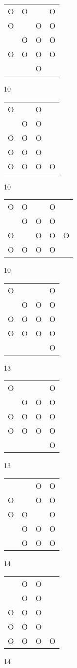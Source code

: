 \begin{tabular}{|m{0.2cm}m{0.2cm}m{0.2cm}m{0.2cm}|}\hline
O&O& &O\\
O& &O&O\\
 &O&O&O\\
O&O&O&O\\
 & &O& \\
\hline\end{tabular}10
\begin{tabular}{|m{0.2cm}m{0.2cm}m{0.2cm}m{0.2cm}|}\hline
O& &O& \\
 &O&O& \\
O&O&O& \\
O&O&O& \\
O&O&O&O\\
\hline\end{tabular}10
\begin{tabular}{|m{0.2cm}m{0.2cm}m{0.2cm}m{0.2cm}m{0.2cm}|}\hline
O&O& &O& \\
 &O&O&O& \\
O& &O&O&O\\
O&O&O&O& \\
\hline\end{tabular}10
\begin{tabular}{|m{0.2cm}m{0.2cm}m{0.2cm}m{0.2cm}|}\hline
O& & &O\\
 &O&O&O\\
O&O&O&O\\
O&O&O&O\\
 & & &O\\
\hline\end{tabular}13
\begin{tabular}{|m{0.2cm}m{0.2cm}m{0.2cm}m{0.2cm}|}\hline
O& & &O\\
 &O&O&O\\
O&O&O&O\\
O&O&O&O\\
 & & &O\\
\hline\end{tabular}13
\begin{tabular}{|m{0.2cm}m{0.2cm}m{0.2cm}m{0.2cm}|}\hline
 & &O&O\\
O& &O&O\\
O&O& &O\\
 &O&O&O\\
 &O&O&O\\
\hline\end{tabular}14
\begin{tabular}{|m{0.2cm}m{0.2cm}m{0.2cm}m{0.2cm}|}\hline
 &O&O& \\
 &O&O& \\
O&O&O& \\
O&O&O& \\
O&O&O&O\\
\hline\end{tabular}14
